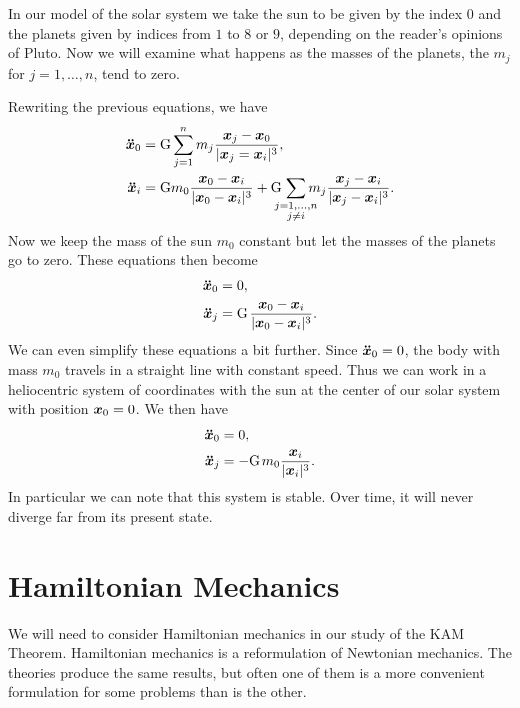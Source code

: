 \documentclass[twoside,letterpaper,10pt]{article}
\numberwithin{equation}{section}
\begin{document}
In our model of the solar system we take the sun to be given by the index $0$
and the planets given by indices from $1$ to $8$ or $9$, depending on the
reader's opinions of Pluto.
Now we will examine what happens as the masses of the planets, the $m_j$ for $j
= 1, \ldots, n$, tend to zero.

Rewriting the previous equations, we have
\begin{align*}
  \bdd{x}_0 &= \mathrm{G} \sum_{j = 1}^n m_j \frac{\bp{x}_j -
              \bp{x}_0}{|\bp{x}_j = \bp{x}_i|^3},\\
  \bdd{x}_i &= \mathrm{G} m_0 \frac{\bp{x}_0 - \bp{x}_i}{|\bp{x}_0 -
              \bp{x}_i|^3} + \mathrm{G} \nobreak\hspace{.125em plus
              .14286em}
              \sum_{\mathclap{\substack{j=1,\ldots,n\\j\neq i}}}
              m_j \frac{\bp{x}_j - \bp{x}_i}{|\bp{x}_j - \bp{x}_i|^3}.
\end{align*}
Now we keep the mass of the sun $m_0$ constant but let the masses of the planets
go to zero.
These equations then become
\begin{align*}
  \bdd{x}_0 &= 0,\\
  \bdd{x}_j &= \mathrm{G} \nobreak\hspace{.125em plus .14286em} \frac{\bp{x}_0 -
              \bp{x}_i}{|\bp{x}_0 - \bp{x}_i|^3}.
\end{align*}
We can even simplify these equations a bit further.
Since $\bm{\ddot{x}}_0 = 0$, the body with mass $m_0$ travels in a straight line with
constant speed.
Thus we can work in a heliocentric system of coordinates with the sun at the
center of our solar system with position $\bm{x}_0 = 0$.
We then have
\begin{align*}
  \bdd{x}_0 &= 0,\\
  \bdd{x}_j &= - \mathrm{G} \nobreak\hspace{.125em plus .14286em}
              m_0 \frac{\bp{x}_i}{|\bp{x}_i|^3}.
\end{align*}
In particular we can note that this system is stable.
Over time, it will never diverge far from its present state.


\section{Hamiltonian Mechanics}
\label{sec:hamilt-mech}

We will need to consider Hamiltonian mechanics in our study of the KAM Theorem.
Hamiltonian mechanics is a reformulation of Newtonian mechanics.
The theories produce the same results, but often one of them is a more
convenient formulation for some problems than is the other.
\end{document}
